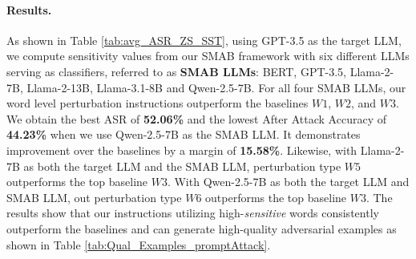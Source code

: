 \paragraph{Results.}As shown in Table \ref{tab:avg_ASR_ZS_SST}, using GPT-3.5 as the target LLM, we compute sensitivity values from our SMAB framework with six different LLMs serving as classifiers, referred to as \textbf{SMAB LLMs}: BERT, GPT-3.5, Llama-2-7B, Llama-2-13B, Llama-3.1-8B and Qwen-2.5-7B. For all four SMAB LLMs,  our word level perturbation instructions outperform the baselines $W1$, $W2$, and $W3$. We obtain the best ASR of \textbf{52.06\%} and the lowest After Attack Accuracy of \textbf{44.23\%} when we use Qwen-2.5-7B as the SMAB LLM. It demonstrates improvement over the baselines by a margin of \textbf{15.58\%}. Likewise, with Llama-2-7B as both the target LLM and the SMAB LLM, perturbation type $W5$ outperforms the top baseline $W3$. With Qwen-2.5-7B as both the target LLM and SMAB LLM, out perturbation type $W6$ outperforms the top baseline $W3$. The results show that our instructions utilizing high-\textit{sensitive} words consistently outperform the baselines and can generate high-quality adversarial examples as shown in Table \ref{tab:Qual_Examples_promptAttack}.


